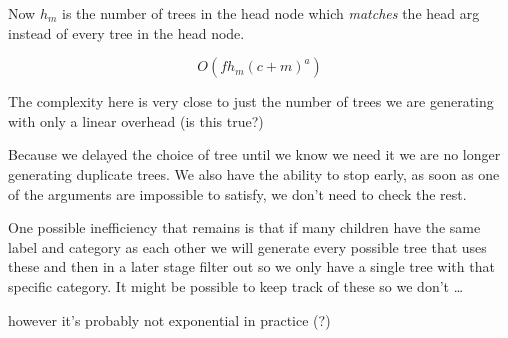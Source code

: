 Now $h_m$ is the number of trees in the head node which \emph{matches} the head arg instead of every tree in the head node.

$$
O(f h_m (c+m)^a)
$$

The complexity here is very close to just the number of trees we are generating with only a linear overhead (is this true?)

Because we delayed the choice of tree until we know we need it we are no longer generating duplicate trees.
We also have the ability to stop early, as soon as one of the arguments are impossible to satisfy, we don't need to check the rest.

One possible inefficiency that remains is that if many children have the same label and category as each other we will
generate every possible tree that uses these and then in a later stage filter out so we only have a single tree with that specific category. It might be possible to keep track of these so we don't \dots

however it's probably not exponential in practice (?)


